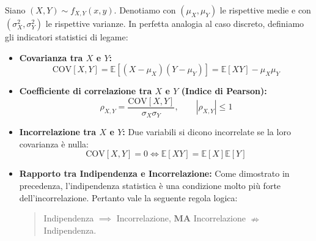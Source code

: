 Siano $(X, Y) \sim f_{X,Y}(x,y)$. Denotiamo con $(\mu_X, \mu_Y)$ le rispettive medie e con $(\sigma_X^2, \sigma_Y^2)$ le rispettive varianze. In perfetta analogia al caso discreto, definiamo gli indicatori statistici di legame:

\begin{itemize}
    \item \textbf{Covarianza tra $X$ e $Y$:}
    \begin{equation}
    \text{COV}[X, Y] = \mathbb{E}[(X - \mu_X)(Y - \mu_Y)] = \mathbb{E}[XY] - \mu_X\mu_Y
    \end{equation}

    \item \textbf{Coefficiente di correlazione tra $X$ e $Y$ (Indice di Pearson):}
    \begin{equation}
    \rho_{X,Y} = \frac{\text{COV}[X, Y]}{\sigma_X \sigma_Y}, \qquad |\rho_{X,Y}| \le 1
    \end{equation}

    \item \textbf{Incorrelazione tra $X$ e $Y$:} Due variabili si dicono incorrelate se la loro covarianza è nulla:
    \begin{equation}
    \text{COV}[X, Y] = 0 \iff \mathbb{E}[XY] = \mathbb{E}[X]\mathbb{E}[Y]
    \end{equation}

    \item \textbf{Rapporto tra Indipendenza e Incorrelazione:} Come dimostrato in precedenza, l'indipendenza statistica è una condizione molto più forte dell'incorrelazione. Pertanto vale la seguente regola logica:
    \begin{quote}
    Indipendenza $\implies$ Incorrelazione, \textbf{MA} Incorrelazione $\nRightarrow$ Indipendenza.
    \end{quote}
\end{itemize}